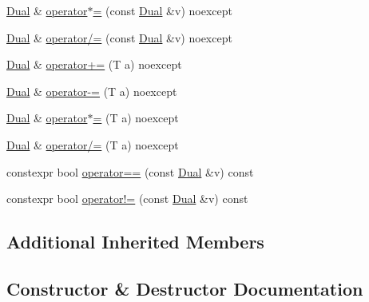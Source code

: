 \begin{DoxyCompactItemize}
\item 
\mbox{\hyperlink{structmage_1_1_dual}{Dual}} \& \mbox{\hyperlink{structmage_1_1_dual_a3fb1bc0b5ddee2e8a3edc72063d129f6}{operator$\ast$=}} (const \mbox{\hyperlink{structmage_1_1_dual}{Dual}} \&v) noexcept
\item 
\mbox{\hyperlink{structmage_1_1_dual}{Dual}} \& \mbox{\hyperlink{structmage_1_1_dual_a49cb40f55ab7a8b80071e1ac509b5c7a}{operator/=}} (const \mbox{\hyperlink{structmage_1_1_dual}{Dual}} \&v) noexcept
\item 
\mbox{\hyperlink{structmage_1_1_dual}{Dual}} \& \mbox{\hyperlink{structmage_1_1_dual_a727d03e57970ba043e39aee493e911b1}{operator+=}} (T a) noexcept
\item 
\mbox{\hyperlink{structmage_1_1_dual}{Dual}} \& \mbox{\hyperlink{structmage_1_1_dual_a44a281c87be500d605e3b717ebc45b85}{operator-\/=}} (T a) noexcept
\item 
\mbox{\hyperlink{structmage_1_1_dual}{Dual}} \& \mbox{\hyperlink{structmage_1_1_dual_a4e86b32a1990fd8401cb224267cd29c6}{operator$\ast$=}} (T a) noexcept
\item 
\mbox{\hyperlink{structmage_1_1_dual}{Dual}} \& \mbox{\hyperlink{structmage_1_1_dual_aa88787b681e0eacf44b72f2ebd37d813}{operator/=}} (T a) noexcept
\item 
constexpr bool \mbox{\hyperlink{structmage_1_1_dual_a225d647abae8ed0fc046c123dae151e1}{operator==}} (const \mbox{\hyperlink{structmage_1_1_dual}{Dual}} \&v) const
\item 
constexpr bool \mbox{\hyperlink{structmage_1_1_dual_ad0e5e31fc17187a56b2b0f7664fed411}{operator!=}} (const \mbox{\hyperlink{structmage_1_1_dual}{Dual}} \&v) const
\end{DoxyCompactItemize}
\subsection*{Additional Inherited Members}


\subsection{Constructor \& Destructor Documentation}
\mbox{\label{structmage_1_1_dual_a7ac9dc0e4574c24523c5b65f95e25eb7}} 

